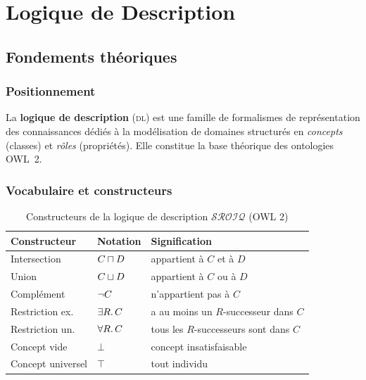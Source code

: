 \chapter{Logique de Description}

\section{Fondements théoriques}

\subsection{Positionnement}

La \textbf{logique de description} (\textsc{dl}) est une famille de formalismes
de représentation des connaissances dédiés à la modélisation de domaines
structurés en \emph{concepts} (classes) et \emph{rôles} (propriétés).
Elle constitue la base théorique des ontologies OWL~2.

\subsection{Vocabulaire et constructeurs}

\begin{table}[H]
\centering
\caption{Constructeurs de la logique de description $\mathcal{SROIQ}$ (OWL 2)}
\begin{tabular}{lll}
\toprule
\textbf{Constructeur} & \textbf{Notation} & \textbf{Signification} \\
\midrule
Intersection   & $C \sqcap D$         & appartient à $C$ et à $D$ \\
Union          & $C \sqcup D$         & appartient à $C$ ou à $D$ \\
Complément     & $\lnot C$           & n'appartient pas à $C$ \\
Restriction ex.& $\exists R.\,C$        & a au moins un $R$-successeur dans $C$ \\
Restriction un.& $\forall R.\,C$         & tous les $R$-successeurs sont dans $C$ \\
Concept vide   & $\bot$                 & concept insatisfaisable \\
Concept universel & $\top$             & tout individu \\
\bottomrule
\end{tabular}
\end{table}

